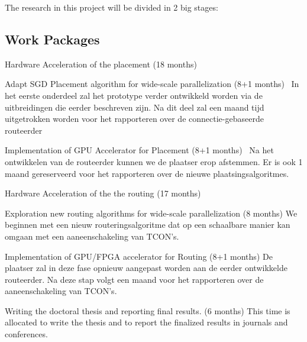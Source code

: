 \documentclass[a4paper,oneside,12pt]{article}
\begin{document}
The research in this project will be divided in 2 big stages:

\subsection{Work Packages}
\begin{description*}
\item[Hardware Acceleration of the placement (18 months)]\

\begin{description*}
\item[Adapt SGD Placement algorithm for wide-scale parallelization (8+1 months)]\
In het eerste onderdeel zal het prototype verder ontwikkeld worden via de uitbreidingen die eerder beschreven zijn. Na dit deel zal een maand tijd uitgetrokken worden voor het rapporteren over de connectie-gebaseerde routeerder
\item[Implementation of GPU Accelerator for Placement (8+1 months)]\
Na het ontwikkelen van de routeerder kunnen we de plaatser erop afstemmen. Er is ook 1 maand gereserveerd voor het rapporteren over de nieuwe plaatsingsalgoritmes.
\end{description*}

\item[Hardware Acceleration of the the routing (17 months)]\

\begin{description*}
\item[Exploration new routing algorithms for wide-scale parallelization (8 months)] 
We beginnen met een nieuw routeringsalgoritme dat op een schaalbare manier kan omgaan met een aaneenschakeling van TCON's.
\item[Implementation of GPU/FPGA accelerator for Routing (8+1 months)]
De plaatser zal in deze fase opnieuw aangepast worden aan de eerder ontwikkelde routeerder. Na deze stap volgt een maand voor het rapporteren over de aaneenschakeling van TCON's.
\end{description*}

\item[Writing the doctoral thesis and reporting final results. (6 months)] This time is allocated to write the thesis and to report the finalized results in journals and conferences.  

\end{description*}
\end{document}
